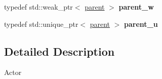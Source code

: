 \begin{DoxyCompactItemize}
\item 
\hypertarget{namespaceNeb_1_1Actor_a907a18d7fb20bd2fa47348dd50f0c34f}{typedef std\-::weak\-\_\-ptr$<$ \hyperlink{classNeb_1_1Actor_1_1parent}{parent} $>$ {\bfseries parent\-\_\-w}}\label{namespaceNeb_1_1Actor_a907a18d7fb20bd2fa47348dd50f0c34f}

\item 
\hypertarget{namespaceNeb_1_1Actor_a745660f22c167b2aa1370bfb9e0c0952}{typedef std\-::unique\-\_\-ptr$<$ \hyperlink{classNeb_1_1Actor_1_1parent}{parent} $>$ {\bfseries parent\-\_\-u}}\label{namespaceNeb_1_1Actor_a745660f22c167b2aa1370bfb9e0c0952}

\end{DoxyCompactItemize}



\subsection{\-Detailed \-Description}
\-Actor 